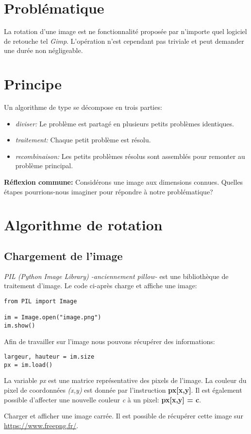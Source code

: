 \documentclass[a4paper,11pt]{article}
\begin{document}
\begin{Form}
\section{Problématique}
La rotation d'une image est ne fonctionnalité proposée par n'importe quel logiciel de retouche tel \emph{Gimp}. L'opération n'est cependant pas triviale et peut demander une durée non négligeable.
\begin{center}
\end{center}
\section{Principe}
Un algorithme de type  se décompose en trois parties:
\begin{itemize}
\item \emph{diviser:} Le problème est partagé en plusieurs petits problèmes identiques.
\item \emph{traitement:} Chaque petit problème est résolu.
\item \emph{recombinaison:} Les petits problèmes résolus sont assemblés pour remonter au problème principal.
\end{itemize}
\begin{activite}
\textbf{Réflexion commune:} Considérons une image aux dimensions connues. Quelles étapes pourrions-nous imaginer pour répondre à notre problématique?
\end{activite}
\section{Algorithme de rotation}
\subsection{Chargement de l'image}
\emph{PIL (Python Image Library) -anciennement pillow-} est une bibliothèque de traitement d'image. Le code ci-après charge et affiche une image:
\begin{lstlisting}
from PIL import Image

im = Image.open("image.png")
im.show()
\end{lstlisting}
Afin de travailler sur l'image nous pouvons récupérer des informations:
\begin{lstlisting}
largeur, hauteur = im.size
px = im.load()
\end{lstlisting}
La variable \emph{px} est une matrice représentative des pixels de l'image. La couleur du pixel de coordonnées \emph{(x,y)} est donnée par l'instruction \textbf{px[x,y]}. Il est également possible d'affecter une nouvelle couleur \emph{c} à un pixel: \textbf{px[x,y] = c}.
\begin{activite}
Charger et afficher une image carrée. Il est possible de récupérer cette image sur \url{https://www.freepng.fr/}.
\end{activite}

\end{Form}
\end{document}
